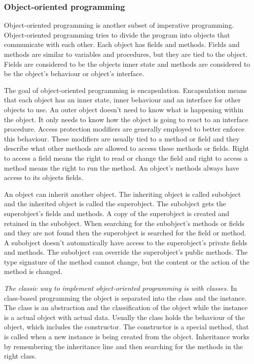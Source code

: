 \subsubsection{Object-oriented programming}

Object-oriented programming is another subset of imperative programming.
Object-oriented programming tries to divide the program into objects that
communicate with each other. Each object has fields and methods. Fields and
methods are similar to variables and procedures, but they are tied to the
object. Fields are considered to be the objects inner state and methods are
considered to be the object's behaviour or object's
interface.\cite{website:object-orientation}

The goal of object-oriented programming is encapsulation. Encapsulation means
that each object has an inner state, inner behaviour and an interface for other
objects to use. An outer object doesn't need to know what is happening within
the object. It only needs to know how the object is going to react to an
interface procedure. Access protection modifiers are generally employed to
better enforce this behaviour. These modifiers are usually tied to a method or
field and they describe what other methods are allowed to access these methods
or fields. Right to access a field means the right to read or change the field
and right to access a method means the right to run the
method. An object's methods always have access to its objects
fields.\cite{website:access-modifiers}

An object can inherit another object. The inheriting object is called subobject and the inherited object is called the superobject. The subobject gets the superobject's fields and methods. A copy of the superobject is created and retained in the subobject. When searching for the subobject's methods or fields and they are not found then the superobject is searched for the field or method. A subobject doesn't automatically have access to the superobject's private fields and methods. The subobject can override the superobject's public methods. The type signature of the method cannot change, but the content or the action of the method is changed.

\emph{The classic way to implement object-oriented programming is with classes.} In class-based programming the object is separated into the class and the instance. The class is an abstraction and the classification of the object while the instance is a actual object with actual data. Usually the class holds the behaviour of the object, which includes the constructor. The constructor is a special method, that is called when a new instance is being created from the object. Inheritance works by remembering the inheritance line and then searching for the methods in the right class.

